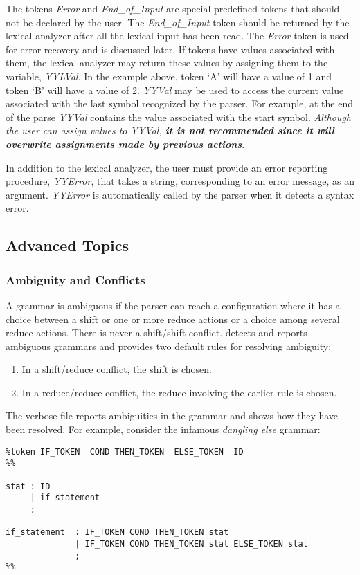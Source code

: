 The tokens {\it Error} and {\it End\_of\_Input} are special predefined tokens
that should not be declared by the user.  The {\it End\_of\_Input} token
should be returned by the lexical analyzer after all the lexical
input has been read.  The {\it Error} token is used for error recovery
and is discussed later.  If tokens have values associated with them,
the lexical analyzer may return these values by assigning them to the
variable,
{\it YYLVal}.
In the example above, token `A' will have a value of 1
and token `B' will have a value of 2.
{\it YYVal}
may be used to
access the current value associated with the last symbol recognized
by the parser.  For example, at the end of the parse
{\it YYVal}
contains the value associated with the start symbol.  {\it Although the
user can assign values to YYVal,
{\bf it is not recommended since it will overwrite assignments
made by previous actions}}.

\newpage
In addition to the lexical analyzer, the user must provide an
error reporting procedure,
{\it YYError},
that takes a string, corresponding to an error message, as an argument.
{\it YYError}
is automatically called by the parser when it detects a syntax error.

\subsection{Advanced Topics}
\subsubsection{Ambiguity and Conflicts}

A grammar is ambiguous if the parser can reach a configuration where
it has a choice between a shift or one or more reduce actions or
a choice among several reduce actions.  There is never a shift/shift
conflict.  \ayacc detects and reports ambiguous grammars and provides two
default rules for resolving ambiguity:

\begin{enumerate}

\item In a shift/reduce conflict, the shift is chosen.
\item In a reduce/reduce conflict, the reduce involving the earlier rule
is chosen.
\end{enumerate}

The verbose file reports ambiguities in the grammar and shows how they have
been resolved.  For example, consider the infamous {\it dangling else} grammar:
\newpage
\begin{verbatim}
%token IF_TOKEN  COND THEN_TOKEN  ELSE_TOKEN  ID
%%

stat : ID
     | if_statement
     ;

if_statement  : IF_TOKEN COND THEN_TOKEN stat
              | IF_TOKEN COND THEN_TOKEN stat ELSE_TOKEN stat
	          ;
%%
\end{verbatim}

